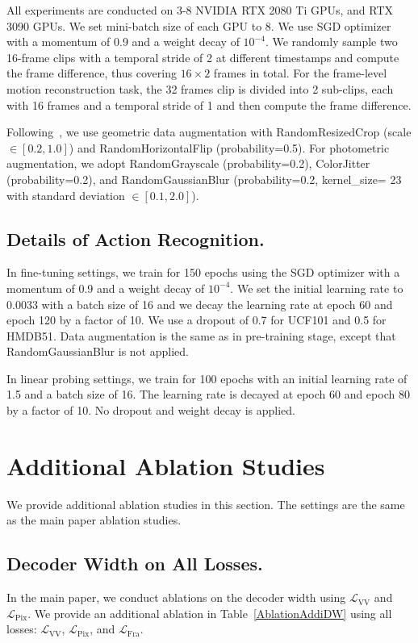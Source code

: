 \documentclass[sigconf,screen]{acmart}
\begin{document}
All experiments are conducted on 3-8 NVIDIA RTX 2080 Ti GPUs, and RTX 3090 GPUs. We set mini-batch size of each GPU to 8. We use SGD optimizer with a momentum of 0.9 and a weight decay of $10^{-4}$. We randomly sample two 16-frame clips with a temporal stride of 2 at different timestamps and compute the frame difference, thus covering $16 \times 2$ frames in total. For the frame-level motion reconstruction task, the 32 frames clip is divided into 2 sub-clips, each with 16 frames and a temporal stride of 1 and then compute the frame difference.   

Following~\cite{ALargeScale,FAME}, we use geometric data augmentation with RandomResizedCrop (scale $\in [0.2, 1.0]$) and RandomHorizontalFlip (probability=0.5). For photometric augmentation, we adopt RandomGrayscale (probability=0.2), ColorJitter (probability=0.2), and RandomGaussianBlur (probability=0.2, kernel\_size= 23 with standard deviation $\in [0.1, 2.0]$).

\subsection{Details of Action Recognition.} 

In fine-tuning settings, we train for 150 epochs using the SGD optimizer with a momentum of 0.9 and a weight decay of $10^{-4}$. We set the initial learning rate to 0.0033 with a batch size of 16 and we decay the learning rate at epoch 60 and epoch 120 by a factor of 10. We use a dropout of 0.7 for UCF101 and 0.5 for HMDB51. Data augmentation is the same as in pre-training stage, except that RandomGaussianBlur is not applied.

In linear probing settings, we train for 100 epochs with an initial learning rate of 1.5 and a batch size of 16. The learning rate is decayed at epoch 60 and epoch 80 by a factor of 10. No dropout and weight decay is applied.


\section{Additional Ablation Studies}

We provide additional ablation studies in this section. The settings are the same as the main paper ablation studies.



\subsection{Decoder Width on All Losses.} 
In the main paper, we conduct ablations on the decoder width using $\mathcal{L}_{\mathrm{VV}}$ and $\mathcal{L}_{\mathrm{Pix}}$. We provide an 
 additional ablation in Table~\ref{AblationAddiDW} using all losses: $\mathcal{L}_{\mathrm{VV}}$, $\mathcal{L}_{\mathrm{Pix}}$, and $\mathcal{L}_{\mathrm{Fra}}$.
\end{document}
